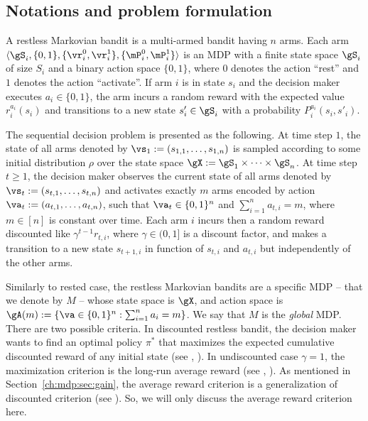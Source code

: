\subsection{Notations and problem formulation}
\label{ssec:restless_formul}

A restless Markovian bandit is a multi-armed bandit having $n$ arms.
Each arm $\langle\gS_i, \{0,1\}, \{\vr^0_i,\vr^1_i\}, \{\mP^0_i,\mP^1_i\}\rangle$ is an MDP with a finite state space $\gS_i$ of size $S_i$ and a binary action space $\{0,1\}$, where $0$ denotes the action ``rest'' and $1$ denotes the action ``activate''.
If arm $i$ is in state $s_i$ and the decision maker executes $a_i\in\{0,1\}$, the arm incurs a random reward with the expected value $r_i^{a_i}(s_i)$ and transitions to a new state $s'_i\in\gS_i$ with a probability $P_i^{a_i}(s_i, s'_i)$.

The sequential decision problem is presented as the following.
At time step $1$, the state of all arms denoted by $\vs_1:=(s_{1,1},\dots,s_{1,n})$ is sampled according to some initial distribution $\rho$ over the state space $\gX:=\gS_1\times\dots\times\gS_n$.
At time step $t\ge1$, the decision maker observes the current state of all arms denoted by $\vs_t:=(s_{t,1},\dots,s_{t,n})$ and activates exactly $m$ arms encoded by action $\va_t:=(a_{t,1},\dots,a_{t,n})$, such that $\va_t\in\{0,1\}^n$ and $\sum_{i=1}^{n} a_{t,i}=m$, where $m\in[n]$ is constant over time.
Each arm $i$ incurs then a random reward discounted like $\gamma^{t-1}r_{t,i}$, where $\gamma\in(0,1]$ is a discount factor, and makes
a transition to a new state $s_{t+1,i}$ in function of $s_{t,i}$ and $a_{t,i}$ but independently of the other arms.

Similarly to rested case, the restless Markovian bandits are a specific MDP -- that we denote by $M$ -- whose state space is $\gX$, and action space is $\gA(m):=\{\va\in\{0,1\}^n : \sum_{i=1}^{n}a_i =m\}$.
We say that $M$ is the \emph{global} MDP.
There are two possible criteria.
In discounted restless bandit, the decision maker wants to find an optimal policy $\pi^*$ that maximizes the expected cumulative discounted reward of any initial state (see \eg, \cite{nino2007dynamic, fu2019towards, akbarzadeh2020conditions, nino2020fast}). 
In undiscounted case $\gamma=1$, the maximization criterion is the long-run average reward (see \eg, \cite{whittle1988restless, whittle1996optimal, papadimitriou1994complexity, gibson2021novel, avrachenkov2022whittle}).
As mentioned in Section~\ref{ch:mdp:sec:gain}, the average reward criterion is a generalization of discounted criterion (see ).
So, we will only discuss the average reward criterion here.

